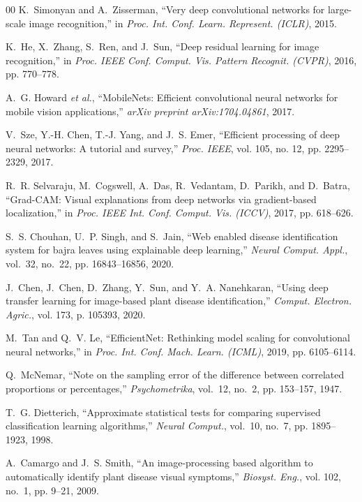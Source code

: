 \documentclass[journal]{IEEEtran}
\begin{document}
\begin{thebibliography}{00}
K.~Simonyan and A.~Zisserman, ``Very deep convolutional networks for large-scale image recognition,'' in \textit{Proc. Int. Conf. Learn. Represent. (ICLR)}, 2015.

K.~He, X.~Zhang, S.~Ren, and J.~Sun, ``Deep residual learning for image recognition,'' in \textit{Proc. IEEE Conf. Comput. Vis. Pattern Recognit. (CVPR)}, 2016, pp. 770--778.

A.~G. Howard \textit{et al.}, ``MobileNets: Efficient convolutional neural networks for mobile vision applications,'' \textit{arXiv preprint arXiv:1704.04861}, 2017.

V.~Sze, Y.-H. Chen, T.-J. Yang, and J.~S. Emer, ``Efficient processing of deep neural networks: A tutorial and survey,'' \textit{Proc. IEEE}, vol. 105, no. 12, pp. 2295--2329, 2017.

R.~R. Selvaraju, M.~Cogswell, A.~Das, R.~Vedantam, D.~Parikh, and D.~Batra, ``Grad-CAM: Visual explanations from deep networks via gradient-based localization,'' in \textit{Proc. IEEE Int. Conf. Comput. Vis. (ICCV)}, 2017, pp. 618--626.

S.~S. Chouhan, U.~P. Singh, and S.~Jain, ``Web enabled disease identification system for bajra leaves using explainable deep learning,'' \textit{Neural Comput. Appl.}, vol.~32, no.~22, pp. 16843--16856, 2020.

J.~Chen, J.~Chen, D.~Zhang, Y.~Sun, and Y.~A. Nanehkaran, ``Using deep transfer learning for image-based plant disease identification,'' \textit{Comput. Electron. Agric.}, vol. 173, p. 105393, 2020.

M.~Tan and Q.~V. Le, ``EfficientNet: Rethinking model scaling for convolutional neural networks,'' in \textit{Proc. Int. Conf. Mach. Learn. (ICML)}, 2019, pp. 6105--6114.

Q.~McNemar, ``Note on the sampling error of the difference between correlated proportions or percentages,'' \textit{Psychometrika}, vol.~12, no.~2, pp. 153--157, 1947.

T.~G. Dietterich, ``Approximate statistical tests for comparing supervised classification learning algorithms,'' \textit{Neural Comput.}, vol.~10, no.~7, pp. 1895--1923, 1998.

A.~Camargo and J.~S. Smith, ``An image-processing based algorithm to automatically identify plant disease visual symptoms,'' \textit{Biosyst. Eng.}, vol. 102, no.~1, pp. 9--21, 2009.


\end{thebibliography}
\end{document}
